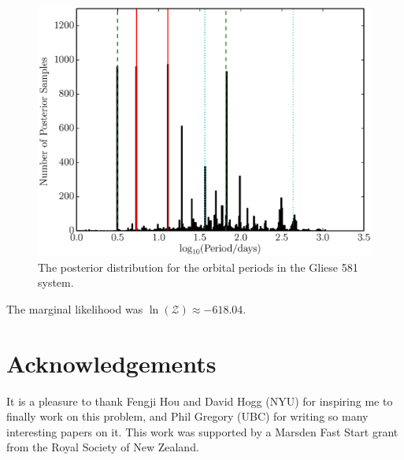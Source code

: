 \documentclass[useAMS,usenatbib]{mn2e}
\begin{document}
\begin{figure}
\includegraphics[scale=0.5]{Figures/gliese581_periods.eps}
\caption{The posterior distribution for the orbital periods in the Gliese 581
system.\label{fig:gliese581_periods}}
\end{figure}

The marginal likelihood was $\ln(\mathcal{Z}) \approx -618.04$.

\vspace{-0.5cm}
\section*{Acknowledgements}
It is a pleasure to thank Fengji Hou and David Hogg (NYU) for inspiring me to
finally work on this problem, and Phil Gregory (UBC) for writing so many
interesting papers on it. This work was supported by a Marsden Fast Start
grant from the Royal Society of
New Zealand.
\end{document}
